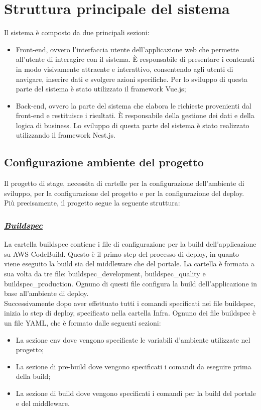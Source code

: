 \section{Struttura principale del sistema}
Il sistema è composto da due principali sezioni:
\begin{itemize}
  \item Front-end, ovvero l'interfaccia utente dell'applicazione web che permette all'utente di interagire con il sistema. È responsabile di presentare i contenuti in modo visivamente attraente e interattivo, consentendo agli utenti di navigare, inserire dati e svolgere azioni specifiche. Per lo
  sviluppo di questa parte del sistema è stato utilizzato il framework Vue.js;
  \item Back-end, ovvero la parte del sistema che elabora le richieste provenienti dal front-end e restituisce i risultati. È responsabile della gestione dei dati e della logica di business.
  Lo sviluppo di questa parte del sistema è stato realizzato utilizzando il framework Nest.js. 
\end{itemize}

\subsection{Configurazione ambiente del progetto}
Il progetto di stage, necessita di cartelle per la configurazione dell'ambiente di sviluppo, per la configurazione del progetto e per la configurazione del deploy.
Più precisamente, il progetto segue la seguente struttura:

\subsubsection*{\normalsize\textit{\uline{Buildspec}}}
La cartella buildspec contiene i file di configurazione per la build dell'applicazione su AWS CodeBuild.
Questo è il primo step del processo di deploy, in quanto viene eseguito la build sia del middleware che del portale.
La cartella è formata a sua volta da tre file: buildspec\_development, buildspec\_quality e buildspec\_production. 
Ognuno di questi file configura la build dell'applicazione in base all'ambiente di deploy.\\
Successivamente dopo aver effettuato tutti i comandi specificati nei file buildspec, inizia lo step di deploy, specificato nella cartella Infra.
Ognuno dei file buildspec è un file YAML, che è formato dalle seguenti sezioni:
\begin{itemize}
  \item La sezione env dove vengono specificate le variabili d'ambiente utilizzate nel progetto;
  \item La sezione di pre-build dove vengono specificati i comandi da eseguire prima della build;
  \item La sezione di build dove vengono specificati i comandi per la build del portale e del middleware.
\end{itemize}

